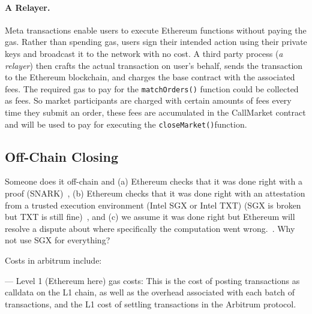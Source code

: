 
\paragraph{A Relayer.} Meta transactions enable users to execute Ethereum functions without paying the gas. Rather than spending gas, users sign their intended action using their private keys and broadcast it to the network with no cost. A third party process (\textit{a relayer}) then crafts the actual transaction on user's behalf, sends the transaction to the Ethereum blockchain, and charges the base contract with the associated fees. The required gas to pay for the \texttt{matchOrders()} function could be collected as fees. So market participants are charged with certain amounts of fees every time they submit an order, these fees are accumulated in the CallMarket contract and will be used to pay for executing the \texttt{closeMarket()}function.





\subsection{Off-Chain Closing}
\label{sec:rollups}


Someone does it off-chain and (a) Ethereum checks that it was done right with a proof (SNARK)~\cite{}, (b) Ethereum checks that it was done right with an attestation from a trusted execution environment (\eg Intel SGX or Intel TXT) (SGX is broken but TXT is still fine)~\cite{cheng2019ekiden}, and (c) we assume it was done right but Ethereum will resolve a dispute about where specifically the computation went wrong.~\cite{kalodner2018arbitrum}. Why not use SGX for everything? 



Costs in arbitrum include:

--- Level 1 (Ethereum here) gas costs: This is the cost of posting transactions as calldata on the L1 chain, as well as the overhead associated with each batch of transactions, and the L1 cost of settling transactions in the Arbitrum protocol.

